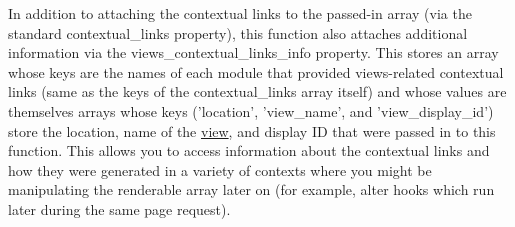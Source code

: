 In addition to attaching the contextual links to the passed-\/in array (via the standard contextual\_\-links property), this function also attaches additional information via the views\_\-contextual\_\-links\_\-info property. This stores an array whose keys are the names of each module that provided views-\/related contextual links (same as the keys of the contextual\_\-links array itself) and whose values are themselves arrays whose keys ('location', 'view\_\-name', and 'view\_\-display\_\-id') store the location, name of the \hyperlink{classview}{view}, and display ID that were passed in to this function. This allows you to access information about the contextual links and how they were generated in a variety of contexts where you might be manipulating the renderable array later on (for example, alter hooks which run later during the same page request).



